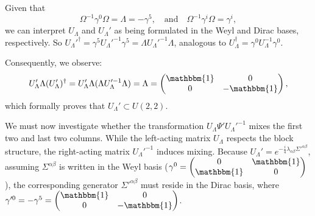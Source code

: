 

Given that 
\[ \Omega^{-1} \gamma^0\Omega=\Lambda=-\gamma^5, \quad \text{and} \quad \Omega^{-1}\gamma^i\Omega=\gamma^i,\] 
we can interpret $U_{\Lambda}$ and $U_{\Lambda}'$ as being formulated in the Weyl and Dirac bases, respectively. So $U_\Lambda'^\dagger=\gamma^5 U_\Lambda'^{-1}\gamma^5=\Lambda U_\Lambda'^{-1}\Lambda$, analogous to $U_\Lambda^\dagger=\gamma^0 U_\Lambda^{-1}\gamma^0$.

Consequently, we observe:
\[ U_{\Lambda}'\Lambda (U_{\Lambda}')^\dagger= U_{\Lambda}'\Lambda (\Lambda U_{\Lambda}'^{-1}\Lambda)=\Lambda=\begin{pmatrix}\mathbbm{1}&0\\ 0 & -\mathbbm{1}\end{pmatrix},\]
which formally proves that $U_{\Lambda}'\subset U(2,2)$. 

We must now investigate whether the transformation $U_{\Lambda} \Psi' U_{\Lambda}'^{-1}$ mixes the first two and last two columns. While the left-acting matrix $U_{\Lambda}$ respects the block structure, the right-acting matrix $U_{\Lambda}'^{-1}$ induces mixing. Because $U_{\Lambda}'=e^{-\frac{i}{4}\lambda_{\alpha\beta}\Sigma'^{\alpha\beta}}$, assuming $\Sigma^{\alpha\beta}$ is written in the Weyl basis ($\gamma^0=\begin{pmatrix}0&\mathbbm{1}\\ \mathbbm{1}&0\end{pmatrix}$), the corresponding generator $\Sigma'^{\alpha\beta}$ must reside in the Dirac basis, where $\gamma'^0=-\gamma^5=\begin{pmatrix}\mathbbm{1}&0\\ 0 & -\mathbbm{1}\end{pmatrix}$.

